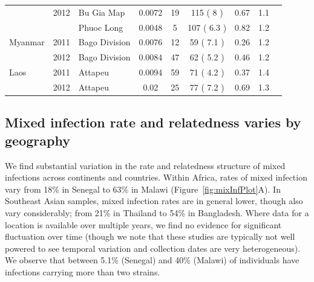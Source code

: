 \documentclass[9pt,lineno]{elife}
\begin{document}
\begin{table}[btp]
{\begin{tabular}{p{1.3cm} c p{1.8cm} c | c c c c p{2.7cm}}
         & 2012 & Bu Gia Map & 0.0072 & 19 & 115 ( 8 )& 0.67 & 1.1&\\
         &      & Phuoc Long & 0.0048 & 5 & 107 ( 6.3 )& 0.82 & 1.2&\\
\cline{1-8}
Myanmar & 2011 & Bago Division & 0.0076 & 12 & 59 ( 7.1 )& 0.26 & 1.2 &\\
        & 2012 & Bago Division & 0.0084 & 47 & 62 ( 5.2 )& 0.46 & 1.2 &\\
\cline{1-8}
Laos & 2011 & Attapeu & 0.0094 & 59 & 71 ( 4.2 )& 0.37 & 1.4 &\\
     & 2012 & Attapeu & 0.02 & 25 & 77 ( 7.2 )& 0.69 & 1.3 &\\
\hline
\bottomrule
\end{tabular}
}

\end{table}

\subsection{Mixed infection rate and relatedness varies by geography}

We find substantial variation in the rate and relatedness structure of mixed infections across continents and countries.  Within Africa, rates of mixed infection vary from 18\% in Senegal to 63\% in Malawi (Figure~\ref{fig:mixInfPlot}A). In Southeast Asian samples, mixed infection rates are in general lower, though also vary considerably; from 21\% in Thailand to 54\% in Bangladesh.  Where data for a location is available over multiple years, we find no evidence for significant fluctuation over time (though we note that these studies are typically not well powered to see temporal variation and collection dates are very heterogeneous). We observe that between 5.1\% (Senegal) and 40\% (Malawi) of individuals have infections carrying more than two strains.
\end{document}
